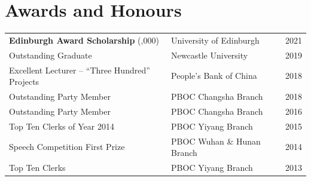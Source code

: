 \section{Awards and Honours}
\begin{tabularx}{\linewidth}{@{}l X r@{}}
\textbf{Edinburgh Award Scholarship} (\textsterling30,000) & University of Edinburgh & 2021 \\
Outstanding Graduate & Newcastle University & 2019 \\
Excellent Lecturer -- ``Three Hundred'' Projects & People's Bank of China & 2018 \\
Outstanding Party Member & PBOC Changsha Branch & 2018 \\
Outstanding Party Member & PBOC Changsha Branch & 2016 \\
Top Ten Clerks of Year 2014 & PBOC Yiyang Branch & 2015 \\
Speech Competition First Prize & PBOC Wuhan \& Hunan Branch & 2014 \\
Top Ten Clerks & PBOC Yiyang Branch & 2013 \\
\end{tabularx}
